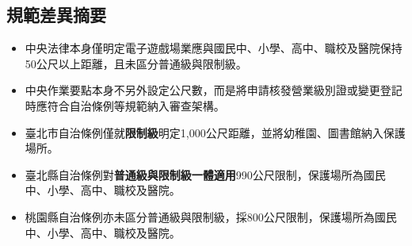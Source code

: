 \subsection{規範差異摘要}

\begin{itemize}
  \item 中央法律本身僅明定電子遊戲場業應與國民中、小學、高中、職校及醫院保持50公尺以上距離，且未區分普通級與限制級。
  \item 中央作業要點本身不另外設定公尺數，而是將申請核發營業級別證或變更登記時應符合自治條例等規範納入審查架構。
  \item 臺北市自治條例僅就\textbf{限制級}明定1,000公尺距離，並將幼稚園、圖書館納入保護場所。
  \item 臺北縣自治條例對\textbf{普通級與限制級一體適用}990公尺限制，保護場所為國民中、小學、高中、職校及醫院。
  \item 桃園縣自治條例亦未區分普通級與限制級，採800公尺限制，保護場所為國民中、小學、高中、職校及醫院。
\end{itemize}




